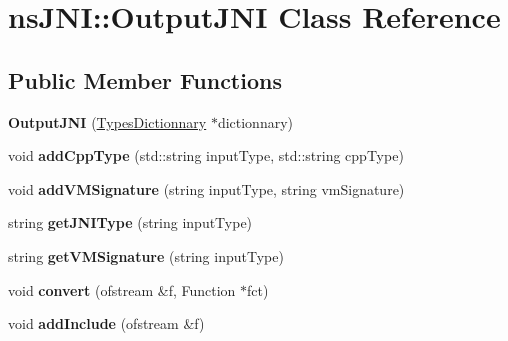 \hypertarget{classnsJNI_1_1OutputJNI}{\section{ns\-J\-N\-I\-:\-:\-Output\-J\-N\-I \-Class \-Reference}
\label{classnsJNI_1_1OutputJNI}
}
\subsection*{\-Public \-Member \-Functions}
\begin{DoxyCompactItemize}
\item 
\hypertarget{classnsJNI_1_1OutputJNI_a41d7f79ee7bda80292e8d84adf949c11}{{\bfseries \-Output\-J\-N\-I} (\hyperlink{classnsJNI_1_1TypesDictionnary}{\-Types\-Dictionnary} $\ast$dictionnary)}\label{classnsJNI_1_1OutputJNI_a41d7f79ee7bda80292e8d84adf949c11}

\item 
\hypertarget{classnsJNI_1_1OutputJNI_a8a74055dd6b743f4714cf18d52b311e8}{void {\bfseries add\-Cpp\-Type} (std\-::string input\-Type, std\-::string cpp\-Type)}\label{classnsJNI_1_1OutputJNI_a8a74055dd6b743f4714cf18d52b311e8}

\item 
\hypertarget{classnsJNI_1_1OutputJNI_aa9bfc541a545da818ace3e2c79bf0954}{void {\bfseries add\-V\-M\-Signature} (string input\-Type, string vm\-Signature)}\label{classnsJNI_1_1OutputJNI_aa9bfc541a545da818ace3e2c79bf0954}

\item 
\hypertarget{classnsJNI_1_1OutputJNI_ad10aefea3e5b8bd67c4c6993a9936753}{string {\bfseries get\-J\-N\-I\-Type} (string input\-Type)}\label{classnsJNI_1_1OutputJNI_ad10aefea3e5b8bd67c4c6993a9936753}

\item 
\hypertarget{classnsJNI_1_1OutputJNI_a859c66a4925649243f1b1445a17fbe07}{string {\bfseries get\-V\-M\-Signature} (string input\-Type)}\label{classnsJNI_1_1OutputJNI_a859c66a4925649243f1b1445a17fbe07}

\item 
\hypertarget{classnsJNI_1_1OutputJNI_aab03ef43240ea65679efa72896a83dc9}{void {\bfseries convert} (ofstream \&f, \-Function $\ast$fct)}\label{classnsJNI_1_1OutputJNI_aab03ef43240ea65679efa72896a83dc9}

\item 
\hypertarget{classnsJNI_1_1OutputJNI_a938df13ee175a5321b812e62f6bef6f3}{void {\bfseries add\-Include} (ofstream \&f)}\label{classnsJNI_1_1OutputJNI_a938df13ee175a5321b812e62f6bef6f3}


\end{DoxyCompactItemize}
